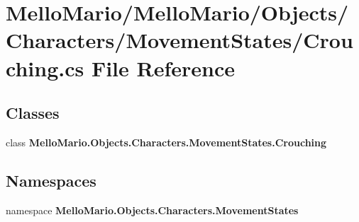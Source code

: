 \section{Mello\+Mario/\+Mello\+Mario/\+Objects/\+Characters/\+Movement\+States/\+Crouching.cs File Reference}
\label{Crouching_8cs}
\subsection*{Classes}
\begin{DoxyCompactItemize}
\item 
class \textbf{ Mello\+Mario.\+Objects.\+Characters.\+Movement\+States.\+Crouching}
\end{DoxyCompactItemize}
\subsection*{Namespaces}
\begin{DoxyCompactItemize}
\item 
namespace \textbf{ Mello\+Mario.\+Objects.\+Characters.\+Movement\+States}
\end{DoxyCompactItemize}
